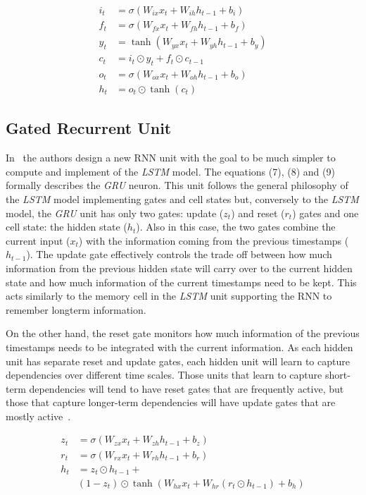 \documentclass[journal, onecolumn]{IEEEtran}
\begin{document}
\begin{align*}
i_{t} &= \sigma(W_{ix} x_{t} + W_{ih} h_{t-1} + b_i  ) \tag{1}\\
f_{t} &= \sigma(W_{fx} x_{t} + W_{fh} h_{t-1} + b_f  ) \tag{2}\\
y_{t} &= \tanh(W_{yx} x_{t} + W_{yh} h_{t-1} + b_y  )  \tag{3}\\
c_t &= i_t \odot y_t + f_t \odot c_{t-1}  \tag{4}\\
o_{t} &= \sigma(W_{ox} x_{t} + W_{oh} h_{t-1} + b_o  ) \tag{5}\\
h_t &= o_t \odot \tanh(c_t) \tag{6}
\end{align*}

\subsection{Gated Recurrent Unit}

In~\cite{ChoMGBBSB14} the authors design a new RNN unit with the goal to be much simpler to compute and implement of the \textit{LSTM} model.
The equations (7), (8) and (9) formally describes the \textit{GRU} neuron. 
This unit follows the general philosophy of the \textit{LSTM} model implementing gates and cell states but, conversely to the \textit{LSTM} model, the \textit{GRU} unit has only two gates: update ($z_t$) and reset ($r_t$) gates and one cell state: the hidden state ($h_t$). 
Also in this case, the two gates combine the current input ($x_t$) with the information coming from the previous timestamps ($h_{t-1}$).
The update gate effectively controls the trade off between how much information from the previous hidden state will carry over to the current hidden state and how much information of the current timestamps need to be kept. This acts similarly to the memory cell in the \textit{LSTM}
unit supporting the RNN to remember longterm information.

On the other hand, the reset gate monitors how much information of the previous timestamps needs to be integrated with the current information. 
As each hidden unit has separate reset and update gates, each hidden unit will learn to capture dependencies over different time scales. Those
units that learn to capture short-term dependencies will tend to have reset gates that are frequently active, but those that capture longer-term dependencies will have update gates that are mostly active~\cite{ChoMGBBSB14}.

\begin{align*}
z_{t} &= \sigma(W_{zx} x_{t} + W_{zh} h_{t-1} + b_z  ) \tag{7} \\
r_{t} &= \sigma(W_{rx} x_{t} + W_{rh} h_{t-1} + b_r  ) \tag{8} \\
h_{t} &= z_t \odot h_{t-1} +  \tag{9} \\
& (1-z_t) \odot \tanh( W_{hx} x_{t} + W_{hr} (r_t \odot h_{t-1})+b_h  )
\end{align*}
\end{document}
